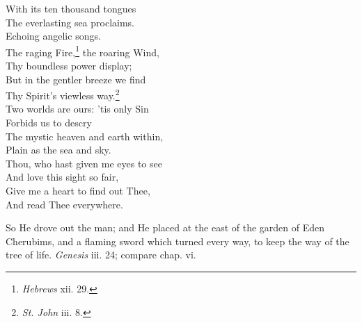  With its ten thousand tongues \\
 The everlasting sea proclaims. \\
 Echoing angelic songs. \\
  The raging Fire,\footnote{\emph{Hebrews} xii. 29.} the roaring Wind, \\
 Thy boundless power display; \\
 But in the gentler breeze we find \\
 Thy Spirit’s viewless way.\footnote{\emph{St. John} iii. 8.} \\
  Two worlds are ours: ’tis only Sin \\
 Forbids us to descry \\
 The mystic heaven and earth within, \\
 Plain as the sea and sky. \\
  Thou, who hast given me eyes to see \\
 And love this sight so fair, \\
 Give me a heart to find out Thee, \\
 And read Thee everywhere.\\


So He drove out the man; and He placed at the east of the garden of Eden Cherubims, and a flaming sword which turned every way, to keep the way of the tree of life. \emph{Genesis} iii. 24; compare chap. vi.

